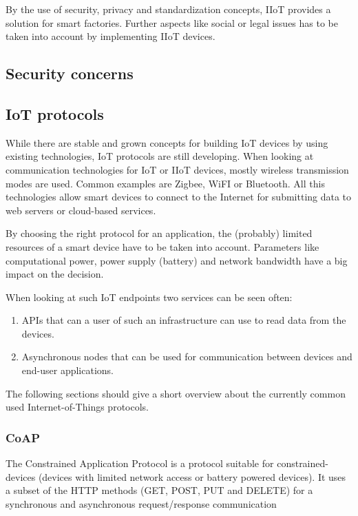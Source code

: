 By the use of security, privacy and standardization concepts, IIoT provides a solution for smart factories. Further aspects like social or legal issues has to be taken into account by implementing IIoT devices\cite{iiot}.

\subsection{Security concerns}

\subsection{IoT protocols}
While there are stable and grown concepts for building IoT devices by using existing technologies, IoT protocols are still developing. When looking at communication technologies for IoT or IIoT devices, mostly wireless transmission modes are used. Common examples are Zigbee, WiFI or Bluetooth. All this technologies allow smart devices to connect to the Internet for submitting data to web servers or cloud-based services\cite{iotprotocols}.

By choosing the right protocol for an application, the (probably) limited resources of a smart device have to be taken into account. Parameters like computational power, power supply (battery) and network bandwidth have a big impact on the decision\cite{iotprotocols}.  

When looking at such IoT endpoints two services can be seen often\cite{iotprotocols}:

\begin{enumerate}
	\item APIs that can a user of such an infrastructure can use to read data from the devices.
	\item Asynchronous nodes that can be used for communication between devices and end-user applications.
\end{enumerate}

The following sections should give a short overview about the currently common used Internet-of-Things protocols\cite{iotprotocols}.

\subsubsection{CoAP}
The Constrained Application Protocol is a protocol suitable for constrained-devices (devices with limited network access or battery powered devices). It uses a subset of the HTTP methods (GET, POST, PUT and DELETE) for a synchronous and asynchronous request/response communication

